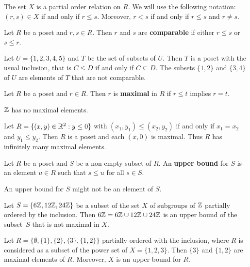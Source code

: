 The set $X$ is a partial order relation on $R$.  
We will use the following notation: $(r,s)\in X$ if and only if $r\leq s$. Moreover, 
$r<s$ if and only if $r\leq s$ and $r\ne s$. 

\begin{definition}
Let $R$ be a poset and $r,s\in R$. Then $r$ and $s$ are \textbf{comparable}
if either $r\leq s$ or $s\leq r$.
\end{definition}

\begin{example}
    Let $U=\{1,2,3,4,5\}$ and $T$ be the set of subsets of $U$. Then $T$ is a poset
    with the usual inclusion, that is $C\leq D$ if and only if $C\subseteq D$. The subsets
    $\{1,2\}$ and $\{3,4\}$ of $U$ are elements of $T$ that are not comparable. 
\end{example}

\begin{definition}
    Let $R$ be a poset and $r\in R$. Then $r$ is \textbf{maximal} in $R$ if 
    $r\leq t$ implies $r=t$. 
\end{definition}

\begin{example}
    $\mathbb{Z}$ has no maximal elements. 
\end{example}

\begin{example}
Let $R=\{(x,y)\in\mathbb{R}^2:y\leq0\}$ with $(x_1,y_1)\leq(x_2,y_2)$ if and only if $x_1=x_2$ and $y_1\leq y_2$. Then
$R$ is a poset and each $(x,0)$ is maximal. Thus $R$ has infinitely many maximal elements.
\end{example}

\begin{definition}
    Let $R$ be a poset and $S$ be a non-empty subset of $R$. An \textbf{upper bound}
    for $S$ is an element $u\in R$ such that $s\leq u$ for all $s\in S$. 
\end{definition}

An upper bound for $S$ might not be an element of $S$. 

\begin{example}
    Let $S=\{6\mathbb{Z},12\mathbb{Z},24\mathbb{Z}\}$ be a subset of the set $X$ 
    of subgroups of $\mathbb{Z}$ partially ordered by 
    the inclusion. Then 
    $6\mathbb{Z}=6\mathbb{Z}\cup 12\mathbb{Z}\cup 24\mathbb{Z}$ is an upper bound of the subset~$S$ 
    that is not maximal in $X$. 
\end{example}

\begin{example}
    Let $R=\{\emptyset, \{1\},\{2\},\{3\},\{1,2\}\}$ partially ordered with
    the inclusion, where $R$ is considered as a subset
    of the power set of $X=\{1,2,3\}$. 
    Then $\{3\}$ and $\{1,2\}$ are maximal elements of $R$. Moreover, 
    $X$ is an upper bound for $R$. 
\end{example}


